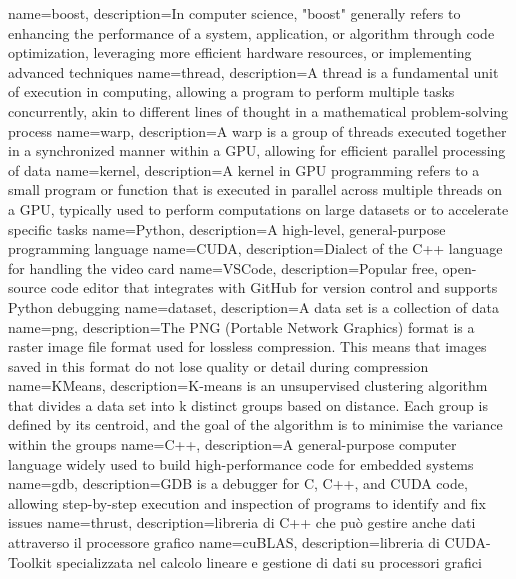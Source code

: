{
    name=boost,
    description={In computer science, "boost" generally refers to enhancing the performance of a system, application, or algorithm through code optimization, leveraging more efficient hardware resources, or implementing advanced techniques}
}
{
    name=thread,
    description={A thread is a fundamental unit of execution in computing, allowing a program to perform multiple tasks concurrently, akin to different lines of thought in a mathematical problem-solving process}
}
{
    name=warp,
    description={A warp is a group of threads executed together in a synchronized manner within a GPU, allowing for efficient parallel processing of data}
}
{
    name=kernel,
    description={A kernel in GPU programming refers to a small program or function that is executed in parallel across multiple threads on a GPU, typically used to perform computations on large datasets or to accelerate specific tasks}
}
{
    name=Python,
    description={A high-level, general-purpose programming language}
}
{
    name=CUDA,
    description={Dialect of the C++ language for handling the video card}
}
{
name=VSCode,
description={Popular free, open-source code editor that integrates with GitHub for version control and supports Python debugging}
}
{
    name=dataset,
    description={A data set is a collection of data}
}
{
    name=png,
    description={The PNG (Portable Network Graphics) format is a raster image file format used for lossless compression. This means that images saved in this format do not lose quality or detail during compression}
}
{
    name=KMeans,
    description={K-means is an unsupervised clustering algorithm that divides a data set into k distinct groups based on distance. Each group is defined by its centroid, and the goal of the algorithm is to minimise the variance within the groups}
}
{
    name=C++,
    description={A general-purpose computer language widely used to build high-performance code for embedded systems}
}
{
name=gdb,
description={GDB is a debugger for C, C++, and CUDA code, allowing step-by-step execution and inspection of programs to identify and fix issues}
}
{
    name=thrust,
    description={libreria di C++ che può gestire anche dati attraverso il processore grafico}
}
{
    name=cuBLAS,
    description={libreria di CUDA-Toolkit specializzata nel calcolo lineare e gestione di dati su processori grafici}
}
